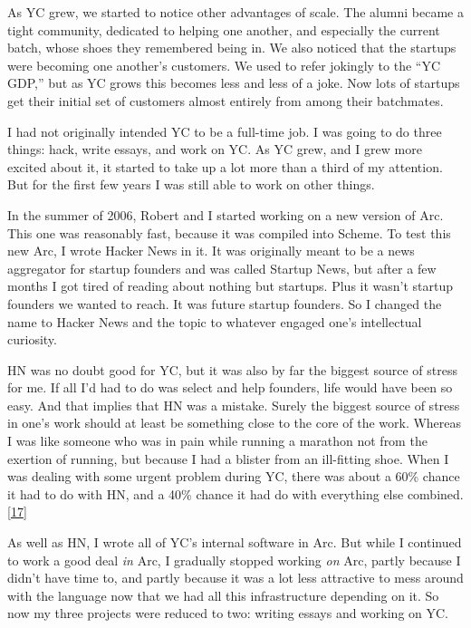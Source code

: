 As YC grew, we started to notice other advantages of scale. The alumni
became a tight community, dedicated to helping one another, and
especially the current batch, whose shoes they remembered being in. We
also noticed that the startups were becoming one another's customers. We
used to refer jokingly to the ``YC GDP,'' but as YC grows this becomes
less and less of a joke. Now lots of startups get their initial set of
customers almost entirely from among their batchmates.

I had not originally intended YC to be a full-time job. I was going to
do three things: hack, write essays, and work on YC. As YC grew, and I
grew more excited about it, it started to take up a lot more than a
third of my attention. But for the first few years I was still able to
work on other things.

In the summer of 2006, Robert and I started working on a new version of
Arc. This one was reasonably fast, because it was compiled into Scheme.
To test this new Arc, I wrote Hacker News in it. It was originally meant
to be a news aggregator for startup founders and was called Startup
News, but after a few months I got tired of reading about nothing but
startups. Plus it wasn't startup founders we wanted to reach. It was
future startup founders. So I changed the name to Hacker News and the
topic to whatever engaged one's intellectual curiosity.

HN was no doubt good for YC, but it was also by far the biggest source
of stress for me. If all I'd had to do was select and help founders,
life would have been so easy. And that implies that HN was a mistake.
Surely the biggest source of stress in one's work should at least be
something close to the core of the work. Whereas I was like someone who
was in pain while running a marathon not from the exertion of running,
but because I had a blister from an ill-fitting shoe. When I was dealing
with some urgent problem during YC, there was about a 60\% chance it had
to do with HN, and a 40\% chance it had do with everything else
combined. {[}\hyperref[f17n]{17}{]}

As well as HN, I wrote all of YC's internal software in Arc. But while I
continued to work a good deal \emph{in} Arc, I gradually stopped working
\emph{on} Arc, partly because I didn't have time to, and partly because
it was a lot less attractive to mess around with the language now that
we had all this infrastructure depending on it. So now my three projects
were reduced to two: writing essays and working on YC.

